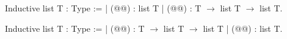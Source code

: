 Inductive list T : Type :=
| (@@) : list T
| (@@) :  T $\rightarrow$ list T $\rightarrow$ list T.

Inductive list T : Type :=
| (@@) : T $\rightarrow$ list T $\rightarrow$ list T
| (@@) : list T.


